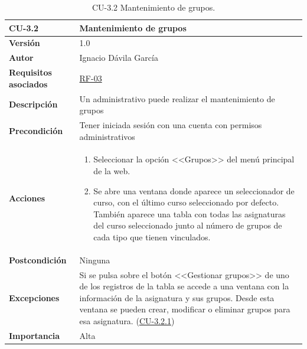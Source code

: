 \begin{table}[p]
\label{table:CU-3.2}
	\centering
	\begin{tabularx}{\linewidth}{ p{} p{} }
		\toprule
		\textbf{CU-3.2}    & \textbf{Mantenimiento de grupos}\\
		\toprule
		\textbf{Versión}              & 1.0    \\
		\textbf{Autor}                & Ignacio Dávila García \\
		\textbf{Requisitos asociados} & \hyperref[itm:RF3]{RF-03} \\
		\textbf{Descripción}          & Un administrativo puede realizar el mantenimiento de grupos \\
		\textbf{Precondición}         & Tener iniciada sesión con una cuenta con permisos administrativos \\
		\textbf{Acciones}             &
		\begin{enumerate}
			\def\labelenumi{\arabic{enumi}.}
			\tightlist
			\item Seleccionar la opción <<Grupos>> del menú principal de la web.
			\item Se abre una ventana donde aparece un seleccionador de curso, con el último curso seleccionado por defecto. También aparece una tabla con todas las asignaturas del curso seleccionado junto al número de grupos de cada tipo que tienen vinculados.
		\end{enumerate}\\
		\textbf{Postcondición}        & Ninguna \\
		\textbf{Excepciones}          & Si se pulsa sobre el botón <<Gestionar grupos>> de uno de los registros de la tabla se accede a una ventana con la información de la asignatura y sus grupos. Desde esta ventana se pueden crear, modificar o eliminar grupos para esa asignatura. (\hyperref[table:CU-3.2.1]{CU-3.2.1}) \\
		\textbf{Importancia}          & Alta \\
		\bottomrule
	\end{tabularx}
	\caption{CU-3.2 Mantenimiento de grupos.}
\end{table}
\FloatBarrier

